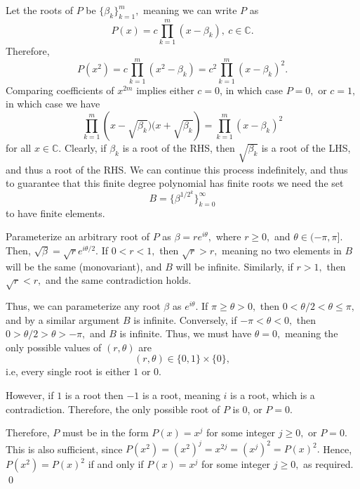 \documentclass[12pt]{article}
\begin{document}
\begin{enumerate}
    Let the roots of $P$ be $\{\beta_k\}_{k = 1}^{m},$ meaning we can
    write $P$ as
    $$
    P(x) = c \prod_{k = 1}^{m} (x - \beta_k), \ c \in \mathbb C.
    $$
    Therefore, $$
    P(x^2) = c \prod_{k = 1}^{m} (x^2 - \beta_k) = c^2 \prod_{k =
    1}^{m}(x - \beta_k)^2.
    $$
    Comparing coefficients of $x^{2m}$ implies either $c = 0$, in
    which case $P = 0,$ or $c = 1,$ in which case we have
    $$
    \prod_{k = 1}^{m}\left(x - \sqrt{\beta_k})(x + \sqrt{\beta
    _k}\right) = \prod_{k = 1}^{m} (x - \beta_k)^2
    $$
    for all $x \in \mathbb C.$ Clearly, if $\beta_k$ is a root of the
    RHS, then $\sqrt{\beta_k}$ is a root of the LHS, and thus a root
    of the RHS. We can continue this process indefinitely, and thus
    to guarantee that this finite degree polynomial has finite roots
    we need the set
    $$
    B = \{\beta^{1/2^k}\}_{k = 0}^{\infty}
    $$
    to have finite elements.

    Parameterize an arbitrary root of $P$ as $\beta = r e^{i
    \theta},$ where $r \geq 0,$ and $\theta \in (-\pi, \pi].$ Then,
    $\sqrt \beta = \sqrt{r} e^{i \theta/2 }.$ If $0 < r < 1,$ then
    $\sqrt{r} > r,$ meaning no two elements in $B$ will be the same
    (monovariant), and $B$ will be infinite. Similarly, if $r > 1,$
    then $\sqrt r < r,$ and the same contradiction holds.

    Thus, we can parameterize any root $\beta$ as $e^{i \theta}.$ If
    $\pi \geq \theta> 0,$ then $0 < \theta/2 < \theta   \leq \pi,$
    and by a similar argument $B$ is infinite. Conversely, if $-\pi <
    \theta < 0,$ then $0 > \theta / 2 > \theta > -\pi,$ and $B$ is
    infinite. Thus, we must have $\theta = 0,$ meaning the only
    possible values of $(r, \theta)$ are
    $$
    (r, \theta) \in \{0, 1\} \times \{0\},
    $$
    i.e, every single root is either $1$ or $0.$

    However, if $1$ is a root then $-1$ is a root, meaning $i$ is a
    root, which is a contradiction. Therefore, the only possible root
    of $P$ is 0, or $P = 0.$

    Therefore, $P$ must be in the form $P(x) = x^j$ for some integer
    $j \geq 0,$ or $P = 0.$ This is also sufficient, since $P(x^2) =
    (x^2)^j = x^{2j} = (x^j)^2 = P(x)^2.$ Hence, $P(x^2) = P(x)^2$ if
    and only if $P(x) = x^j$ for some integer $j \geq 0,$ as required. \qed
\end{enumerate}
\end{document}
